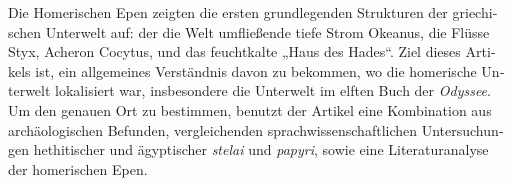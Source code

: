 \begin{myabstract}
	\foreignlanguage{ngerman}{%
		Die Homerischen Epen zeigten die ersten grundlegenden Strukturen der griechischen Unterwelt auf: der die Welt umfließende tiefe Strom Okeanus, die Flüsse Styx, Acheron Cocytus, und das feuchtkalte „Haus des Hades“. Ziel dieses Artikels ist, ein allgemeines Verständnis davon zu bekommen, wo die homerische Unterwelt lokalisiert war, insbesondere die Unterwelt im elften Buch der \emph{Odyssee}. 
		Um den genauen Ort zu bestimmen, benutzt der Artikel eine Kombination aus archäologischen Befunden, vergleichenden sprachwissenschaftlichen Untersuchungen hethitischer und ägyptischer \emph{stelai} und \emph{papyri}, sowie eine Literaturanalyse der homerischen Epen.}
	
\end{myabstract}

	
	
\printbibliography[heading=subbibnumbered] 
\label{Norman:lastpage}
\closingarticle
